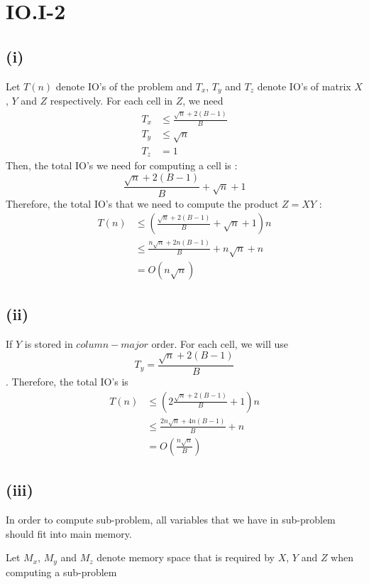 \section*{IO.I-2}
\subsection*{(i)}
Let $T(n)$ denote IO's of the problem and $T_x$, $T_y$ and $T_z$ denote IO's of matrix $X$, $Y$ and $Z$ respectively.
For each cell in $Z$, we need
\begin{align*}
	T_x &\leq \frac{\sqrt{n}+2(B-1)}{B}\\
	T_y &\leq \sqrt{n} \\
	T_z &= 1
\end{align*}
Then, the total IO's we need for computing a cell is :
$$\frac{\sqrt{n}+2(B-1)}{B} + \sqrt{n} + 1$$
Therefore, the total IO's that we need to compute the product $Z=XY$ :
\begin{align*}
	T(n) &\leq ( \frac{\sqrt{n}+2(B-1)}{B} + \sqrt{n} + 1	)n\\
	&\leq \frac{n\sqrt{n}+2n(B-1)}{B} + n\sqrt{n} + n \\
	&= O(n\sqrt{n})
\end{align*}

\subsection*{(ii)}
If $Y$ is stored in $column-major$ order. For each cell, we will use $$T_y=\frac{\sqrt{n}+2(B-1)}{B}$$.
Therefore, the total IO's is
\begin{align*}
	T(n) &\leq ( 2\frac{\sqrt{n}+2(B-1)}{B} + 1	)n\\
	&\leq \frac{2n\sqrt{n}+4n(B-1)}{B} + n \\
	&= O(\frac{n\sqrt{n}}{B})
\end{align*}

\subsection*{(iii)}


In order to compute sub-problem, all variables that we have in sub-problem should fit into main memory. 

Let $M_x$, $M_y$ and $M_z$ denote memory space that is required by $X$, $Y$ and $Z$ when computing a sub-problem

